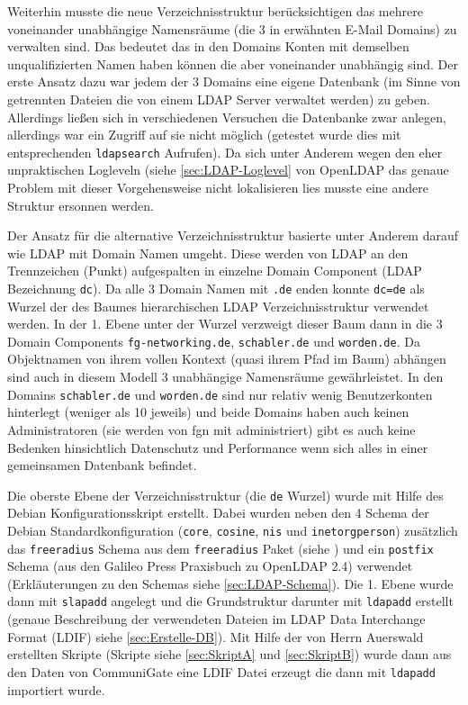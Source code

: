 \documentclass[11pt,a4paper,titlepage=firstiscover]{scrartcl} %
\begin{document}
Weiterhin musste die neue Verzeichnisstruktur berücksichtigen das mehrere voneinander unabhängige Namensräume (die 3 in  erwähnten E-Mail Domains) zu verwalten sind. Das bedeutet das in den Domains Konten mit demselben unqualifizierten Namen haben können die aber voneinander unabhängig sind. Der erste Ansatz dazu war jedem der 3 Domains eine eigene Datenbank (im Sinne von getrennten Dateien die von einem LDAP Server verwaltet werden) zu geben. Allerdings lie\ss{}en sich in verschiedenen Versuchen die Datenbanke zwar anlegen, allerdings war ein Zugriff auf sie nicht möglich (getestet wurde dies mit entsprechenden \texttt{ldapsearch} Aufrufen). Da sich unter Anderem wegen den eher unpraktischen Logleveln (siehe \autoref{sec:LDAP-Loglevel} von OpenLDAP das genaue Problem mit dieser Vorgehensweise nicht lokalisieren lies musste eine andere Struktur ersonnen werden.

Der Ansatz für die alternative Verzeichnisstruktur basierte unter Anderem darauf wie LDAP mit Domain Namen umgeht. Diese werden von LDAP an den Trennzeichen (Punkt) aufgespalten in einzelne Domain Component (LDAP Bezeichnung \texttt{dc}). Da alle 3 Domain Namen mit \texttt{.de} enden konnte \texttt{dc=de} als Wurzel der des Baumes hierarchischen LDAP Verzeichnisstruktur verwendet werden. In der 1. Ebene unter der Wurzel verzweigt dieser Baum dann in die 3 Domain Components  \texttt{fg-networking.de}, \texttt{schabler.de} und \texttt{worden.de}. Da Objektnamen von ihrem vollen Kontext (quasi ihrem Pfad im Baum) abhängen sind auch in diesem Modell 3 unabhängige Namensräume gewährleistet. In den Domains \texttt{schabler.de} und \texttt{worden.de} sind nur relativ wenig Benutzerkonten hinterlegt (weniger als 10 jeweils) und beide Domains haben auch keinen Administratoren (sie werden von fgn mit administriert) gibt es auch keine Bedenken hinsichtlich Datenschutz und Performance wenn sich alles in einer gemeinsamen Datenbank befindet.

Die oberste Ebene der Verzeichnisstruktur (die \texttt{de} Wurzel) wurde mit Hilfe des Debian Konfigurationsskript erstellt. Dabei wurden neben den 4 Schema der Debian Standardkonfiguration (\texttt{core}, \texttt{cosine}, \texttt{nis} und \texttt{inetorgperson}) zusätzlich das \texttt{freeradius} Schema aus dem \texttt{freeradius} Paket (siehe ) und ein \texttt{postfix} Schema (aus den Galileo Press Praxisbuch zu OpenLDAP 2.4) verwendet (Erkläuterungen zu den Schemas siehe \autoref{sec:LDAP-Schema}). Die 1. Ebene wurde dann mit \texttt{slapadd} angelegt und die Grundstruktur darunter mit \texttt{ldapadd} erstellt (genaue Beschreibung der verwendeten Dateien im LDAP Data Interchange Format (LDIF) siehe \autoref{sec:Erstelle-DB}). Mit Hilfe der von Herrn Auerswald erstellten Skripte (Skripte siehe \autoref{sec:SkriptA} und \autoref{sec:SkriptB}) wurde dann aus den Daten von CommuniGate eine LDIF Datei erzeugt die dann mit \texttt{ldapadd} importiert wurde.
\end{document}

